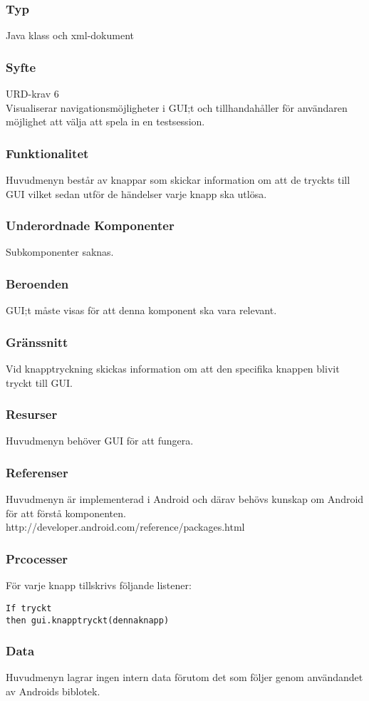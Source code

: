 \subsubsection{Typ}
Java klass och xml-dokument

\subsubsection{Syfte}
URD-krav 6 \\
Visualiserar navigationsmöjligheter i GUI;t och tillhandahåller för användaren möjlighet att välja att spela in en testsession. 

\subsubsection{Funktionalitet}
Huvudmenyn består av knappar som skickar information om att de tryckts till GUI vilket sedan utför de händelser varje knapp  ska utlösa.

\subsubsection{Underordnade Komponenter}
Subkomponenter saknas.

\subsubsection{Beroenden}
GUI;t måste visas för att denna komponent ska vara relevant.

\subsubsection{Gränssnitt}
Vid knapptryckning skickas information om att den specifika knappen blivit tryckt till GUI.

\subsubsection{Resurser}
Huvudmenyn behöver GUI för att fungera.

\subsubsection{Referenser}
Huvudmenyn är implementerad i Android och därav behövs kunskap om Android för att förstå komponenten.
http://developer.android.com/reference/packages.html

\subsubsection{Prcocesser}
För varje knapp tillskrivs följande listener:
\begin{verbatim}
If tryckt
then gui.knapptryckt(dennaknapp)
\end{verbatim}

\subsubsection{Data}
Huvudmenyn lagrar ingen intern data förutom det som följer genom användandet av Androids biblotek.
